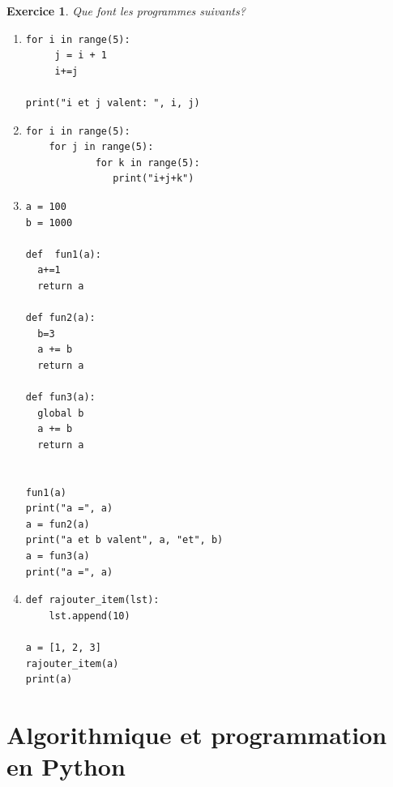 \documentclass[11pt]{article}
\newtheorem{exercice}{Exercice}[section]
\begin{document}
\begin{exercice}
Que font les programmes suivants?
\begin{enumerate}
\item 
\begin{verbatim}
for i in range(5):
     j = i + 1
     i+=j

print("i et j valent: ", i, j)
\end{verbatim}

\item
\begin{verbatim}
for i in range(5):
    for j in range(5):
	        for k in range(5):
	           print("i+j+k")
\end{verbatim}

\item 
\begin{verbatim}
a = 100
b = 1000

def  fun1(a):
  a+=1
  return a

def fun2(a):
  b=3
  a += b
  return a

def fun3(a):
  global b
  a += b
  return a


fun1(a)
print("a =", a)
a = fun2(a)
print("a et b valent", a, "et", b)
a = fun3(a)
print("a =", a)
\end{verbatim}

\item 
\begin{verbatim}
def rajouter_item(lst):
    lst.append(10)

a = [1, 2, 3]
rajouter_item(a)
print(a)  
\end{verbatim}


\end{enumerate}
\end{exercice}

\section{Algorithmique et programmation en Python}
\end{document}
